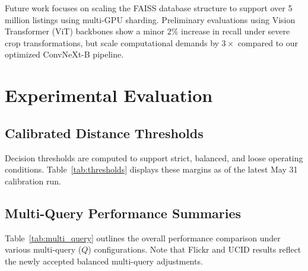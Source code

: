 \documentclass[11pt,a4paper]{article}
\begin{document}
Future work focuses on scaling the FAISS database structure to support over 5 million listings using multi-GPU sharding. Preliminary evaluations using Vision Transformer (ViT) backbones show a minor $2\%$ increase in recall under severe crop transformations, but scale computational demands by $3\times$ compared to our optimized ConvNeXt-B pipeline.

\section{Experimental Evaluation}

\subsection{Calibrated Distance Thresholds}
Decision thresholds are computed to support strict, balanced, and loose operating conditions. Table~\ref{tab:thresholds} displays these margins as of the latest May 31 calibration run.

\begin{table}[htbp]
\centering
\caption{Embedding Distance Threshold and Operating Point Summaries (May 31)}
\label{tab:thresholds}
\end{table}

\subsection{Multi-Query Performance Summaries}
Table~\ref{tab:multi_query} outlines the overall performance comparison under various multi-query ($Q$) configurations. Note that Flickr and UCID results reflect the newly accepted balanced multi-query adjustments.
\end{document}
